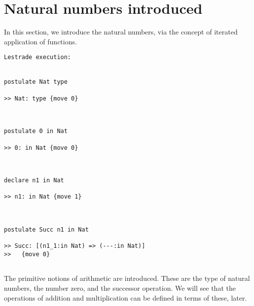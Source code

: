 \documentclass[12pt]{article}
\begin{document}
\section{Natural numbers introduced}




In this section, we introduce the natural numbers, via the concept of iterated application of functions.

\begin{verbatim}Lestrade execution:


postulate Nat type

>> Nat: type {move 0}



postulate 0 in Nat

>> 0: in Nat {move 0}



declare n1 in Nat

>> n1: in Nat {move 1}



postulate Succ n1 in Nat

>> Succ: [(n1_1:in Nat) => (---:in Nat)]
>>   {move 0}


\end{verbatim}

The primitive notions of arithmetic are introduced.  These are the type of natural numbers, the number zero, and the successor operation.  We will see that the operations of addition and multiplication can be defined in terms of these, later.
\end{document}
